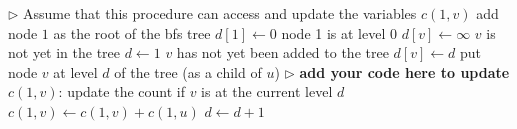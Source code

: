 \documentclass[11pt,fleqn]{exam}
\newenvironment{soln}{\color{solnblue}}{}
\begin{document}
\begin{questions}
 \begin{algorithmic}
\State $\triangleright$ Assume that this procedure can access and update the variables $c(1,v)$
\State add node $1$ as the root of the bfs tree
\State $d[1] \gets 0$ \Comment node 1 is at level 0
   \State $d[v] \gets \infty$ \Comment $v$ is not yet in the tree
\EndFor
\State $d \gets 1$
         \Comment $v$ has not yet been added to the tree
           \State $d[v] \gets d$  \Comment put node $v$ at level $d$ of the tree (as a child of $u$)
        \EndIf
            \State $\triangleright$ {\bf add your code here to update $c(1,v)$}:
            \begin{soln}
                \Comment update the count if \(v\) is at the current level \(d\)
                  \State \(c(1,v) \gets c(1,v) + c(1,u)\)
               \EndIf
            \end{soln}
\EndFor
   \EndFor
   \State $d \gets d+1$        
\EndWhile
\EndProcedure
  \end{algorithmic}
   \fi   
 \end{questions}

\clearpage

\end{document}
